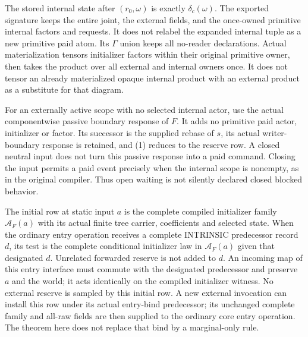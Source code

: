 \documentclass[11pt]{article}
\begin{document}
The stored internal state after $(r_0,\omega)$ is exactly $\delta_c(\omega)$. The exported signature keeps the entire joint, the external fields, and the once-owned primitive internal factors and requests. It does not relabel the expanded internal tuple as a new primitive paid atom. Its $\Gamma$ union keeps all no-reader declarations. Actual materialization tensors initializer factors within their original primitive owner, then takes the product over all external and internal owners once. It does not tensor an already materialized opaque internal product with an external product as a substitute for that diagram.

For an externally active scope with no selected internal actor, use the actual componentwise passive boundary response of $F$. It adds no primitive paid actor, initializer or factor. Its successor is the supplied rebase of $s$, its actual writer-boundary response is retained, and (1) reduces to the reserve row. A closed neutral input does not turn this passive response into a paid command. Closing the input permits a paid event precisely when the internal scope is nonempty, as in the original compiler. Thus open waiting is not silently declared closed blocked behavior.

The initial row at static input $a$ is the complete compiled initializer family $\mathcal A_F(a)$ with its actual finite tree carrier, coefficients and selected state. When the ordinary entry operation receives a complete INTRINSIC predecessor record $d$, its test is the complete conditional initializer law in $\mathcal A_F(a)$ given that designated $d$. Unrelated forwarded reserve is not added to $d$. An incoming map of this entry interface must commute with the designated predecessor and preserve $a$ and the world; it acts identically on the compiled initializer witness. No external reserve is sampled by this initial row. A new external invocation can install this row under its actual entry-bind predecessor; its unchanged complete family and all-raw fields are then supplied to the ordinary core entry operation. The theorem here does not replace that bind by a marginal-only rule.
\end{document}
